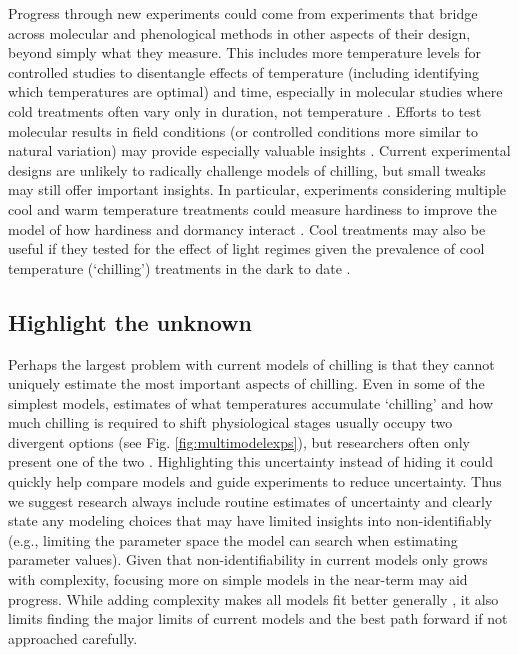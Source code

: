 \documentclass[11pt]{article}
\begin{document}
Progress through new experiments could come from experiments that bridge across molecular and phenological methods in other aspects of their design, beyond simply what they measure. This includes more temperature levels for controlled studies to disentangle effects of temperature (including identifying which temperatures are optimal) and time, especially in molecular studies where cold treatments often vary only in duration, not temperature \citep[e.g.,][]{rinne2011,pan2023epigenetic}. Efforts to test molecular results in field conditions (or controlled conditions more similar to natural variation) may provide especially valuable insights   \citep[e.g.][and see below, `Model experimental and observational data together']{Wilczek:2009oa,Burghardt2015}. Current experimental designs are unlikely to radically challenge models of chilling, but small tweaks may still offer important insights. In particular, experiments considering multiple cool and warm temperature treatments could measure hardiness to improve the model of how hardiness and dormancy interact \citep{kovaleskipreprint}. Cool treatments may also be useful if they tested for the effect of light regimes given the prevalence of cool temperature (`chilling') treatments in the dark to date \citep{ospreebbms}. 

\subsection*{Highlight the unknown} 
Perhaps the largest problem with current models of chilling is that they cannot uniquely estimate the most important aspects of chilling. Even in some of the simplest models, estimates of what temperatures accumulate `chilling' and how much chilling is required to shift physiological stages usually occupy two divergent options (see Fig. \ref{fig:multimodelexps}), but researchers often only present one of the two \citep{chuine2016}.
Highlighting this uncertainty instead of hiding it could quickly help compare models and guide experiments to reduce uncertainty. Thus we suggest research always include routine estimates of uncertainty and clearly state any modeling choices that may have limited insights into non-identifiably 
(e.g., limiting the parameter space the model can search when estimating parameter values). Given that non-identifiability in current models only grows with complexity, focusing more on simple models in the near-term may aid progress. While adding complexity makes all models fit better generally \citep{statrethink}, it also limits finding the major limits of current models and the best path forward if not approached carefully. 
\end{document}
